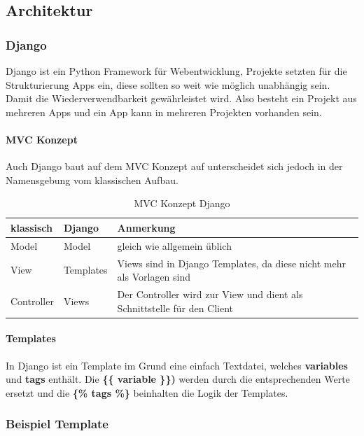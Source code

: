 \subsection{Architektur}

\subsubsection{Django}
Django ist ein Python Framework für Webentwicklung, Projekte setzten für die Strukturierung Apps ein, diese sollten so weit wie möglich unabhängig sein. Damit die Wiederverwendbarkeit gewährleistet wird. Also besteht ein Projekt aus mehreren Apps und ein App kann in mehreren Projekten vorhanden sein.
\paragraph{MVC Konzept}
Auch Django baut auf dem MVC Konzept auf unterscheidet sich jedoch in der Namensgebung vom klassischen Aufbau. 
\medskip
\begin{table}[H]
\centering
    \begin{tabular}{|l|l|l|}
    \hline    
    \rowcolor{lightblue}
	klassisch & Django & Anmerkung \\ \hline
	Model & Model & gleich wie allgemein üblich \\ \hline
	View & Templates & Views sind in Django Templates, da diese nicht mehr als Vorlagen sind \\ \hline
	Controller & Views & Der Controller wird zur View und dient als Schnittstelle für den Client \\ \hline
    \end{tabular}
    \caption[MVC Konzept Django]{MVC Konzept Django}
\end{table}

\paragraph{Templates}
In Django ist ein Template im Grund eine einfach Textdatei, welches \textbf{variables} und \textbf{tags} enthält. Die \textbf{\{\{ variable \}\})} werden durch die entsprechenden Werte ersetzt und die \textbf{\{\% tags \%\}} beinhalten die Logik der Templates.

\subsubsection{Beispiel Template}

